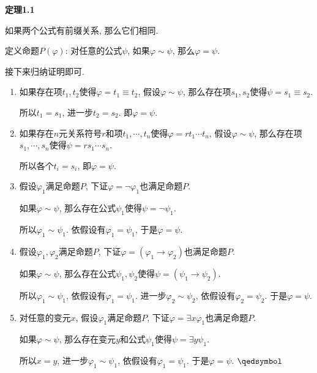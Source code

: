 \vspace{10pt}

\hypertarget{sec:定理1.1}{}
\noindent\textbf{定理1.1}

如果两个公式有前缀关系, 那么它们相同.


定义命题$P(\varphi)$:
对任意的公式$\psi$, 如果$\varphi\sim\psi$, 那么$\varphi=\psi$.

接下来归纳证明即可.

\begin{enumerate}
    \item 如果存在项$t_1,t_2$使得$\varphi=t_1\equiv t_2$,
    假设$\varphi\sim\psi$, 那么存在项$s_1,s_2$使得$\psi=s_1\equiv s_2$.

    \hspace{2.17em}
    所以$t_1=s_1$, 进一步$t_2=s_2$. 即$\varphi=\psi$.

    \item 如果存在$n$元关系符号$r$和项$t_1,\cdots,t_n$使得$\varphi=rt_1\cdots t_n$,
    假设$\varphi\sim\psi$, 那么存在项$s_1,\cdots,s_n$使得$\psi=rs_1\cdots s_n$.

    \hspace{2.17em}
    所以各个$t_i=s_i$, 即$\varphi=\psi$.

    \item 假设$\varphi_1$满足命题$P$, 下证$\varphi=\neg\varphi_1$也满足命题$P$.
    
    \hspace{2.17em}
    如果$\varphi\sim\psi$, 那么存在公式$\psi_1$使得$\psi=\neg\psi_1$.

    \hspace{2.17em}
    所以$\varphi_1\sim\psi_1$. 依假设有$\varphi_1=\psi_1$, 于是$\varphi=\psi$.

    \item 假设$\varphi_1,\varphi_2$满足命题$P$,
    下证$\varphi=(\varphi_1\to\varphi_2)$也满足命题$P$.

    \hspace{2.17em}
    如果$\varphi\sim\psi$,
    那么存在公式$\psi_1,\psi_2$使得$\psi=(\psi_1\to\psi_2)$.

    \hspace{2.17em}
    所以$\varphi_1\sim\psi_1$, 依假设有$\varphi_1=\psi_1$.
    进一步$\varphi_2\sim\psi_2$, 依假设有$\varphi_2=\psi_2$. 于是$\varphi=\psi$.

    \item 对任意的变元$x$, 假设$\varphi_1$满足命题$P$,
    下证$\varphi=\exists x\varphi_1$也满足命题$P$.

    \hspace{2.17em}
    如果$\varphi\sim\psi$,
    那么存在变元$y$和公式$\psi_1$使得$\psi=\exists y\psi_1$.

    \hspace{2.17em}
    所以$x=y$, 进一步$\varphi_1\sim\psi_1$, 依假设有$\varphi_1=\psi_1$.
    于是$\varphi=\psi$. \hfill $\qedsymbol$
\end{enumerate}





